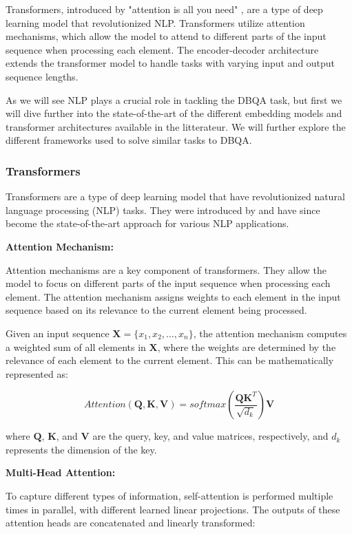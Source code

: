 \documentclass[a4paper,12pt]{article}
\begin{document}
Transformers, introduced by "attention is all you need" \cite{attention}, are a type of deep learning model that revolutionized NLP. 
Transformers utilize attention mechanisms, which allow the model to attend to different parts of the input sequence when processing each element. 
The encoder-decoder architecture extends the transformer model to handle tasks with varying input and output sequence lengths.

As we will see NLP plays a crucial role in tackling the DBQA task, but first we will dive further into the state-of-the-art of the different embedding models 
and transformer architectures available in the litterateur. We will further explore the different frameworks used to solve similar tasks to DBQA.  




\subsubsection{Transformers}

Transformers are a type of deep learning model that have revolutionized natural language processing (NLP) tasks. They were introduced by \cite{attention} and have since become the state-of-the-art approach for various NLP applications.

\textbf{Attention Mechanism:}

Attention mechanisms are a key component of transformers. They allow the model to focus on different parts of the input sequence when processing each element. The attention mechanism assigns weights to each element in the input sequence based on its relevance to the current element being processed.

Given an input sequence $\mathbf{X} = \{x_1, x_2, \ldots, x_n\}$, the attention mechanism computes a weighted sum of all elements in $\mathbf{X}$, where the weights are determined by the relevance of each element to the current element. This can be mathematically represented as:

$$Attention(\mathbf{Q}, \mathbf{K}, \mathbf{V}) = softmax\left(\frac{\mathbf{QK}^T}{\sqrt{d_k}}\right) \mathbf{V}$$

where $\mathbf{Q}$, $\mathbf{K}$, and $\mathbf{V}$ are the query, key, and value matrices, respectively, and $d_k$ represents the dimension of the key.

\textbf{Multi-Head Attention:}

To capture different types of information, self-attention is performed multiple times in parallel, with different learned linear projections. The outputs of these attention heads are concatenated and linearly transformed:
\end{document}
